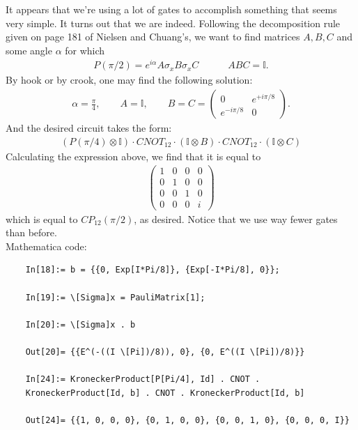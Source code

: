 \documentclass{article}
\theoremstyle{definition}
\newcommand{\al}{\alpha}
\newcommand{\f}[2]{\frac{#1}{#2}}
\begin{document}
\begin{enumerate}[label=(\alph*)]
It appears that we're using a lot of gates to accomplish something that seems very simple. It turns out that we are indeed. Following the decomposition rule given on page 181 of Nielsen and Chuang's, we want to find matrices $A,B,C$ and some angle $\alpha$ for which 
\begin{align*}
P(\pi/2) = e^{i\al} A\sigma_x B\sigma_x C \quad\quad\quad ABC = \mathbb{I}.
\end{align*}
By hook or by crook, one may find the following solution:
\begin{align*}
\al = \f{\pi}{4}, \quad\quad A=\mathbb{I}, \quad \quad B = C = \begin{pmatrix}
0 & e^{+i\pi/8} \\ e^{-i\pi/8} & 0
\end{pmatrix}.
\end{align*}
And the desired circuit takes the form:
\begin{align*}
(P(\pi/4)\otimes \mathbb{I}) \cdot CNOT_{12} \cdot (\mathbb{I} \otimes B) \cdot CNOT_{12} \cdot (\mathbb{I} \otimes C)
\end{align*}
Calculating the expression above, we find that it is equal to
\begin{align*}
\begin{pmatrix}
1 & 0 & 0 & 0 \\
0 & 1 & 0 & 0 \\
0 & 0 & 1 & 0 \\
0 & 0 & 0 & i
\end{pmatrix}
\end{align*}
which is equal to $CP_{12}(\pi/2)$, as desired. Notice that we use way fewer gates than before. \\


Mathematica code:
\begin{lstlisting}
	In[18]:= b = {{0, Exp[I*Pi/8]}, {Exp[-I*Pi/8], 0}};
	
	In[19]:= \[Sigma]x = PauliMatrix[1];
	
	In[20]:= \[Sigma]x . b
	
	Out[20]= {{E^(-((I \[Pi])/8)), 0}, {0, E^((I \[Pi])/8)}}
	
	In[24]:= KroneckerProduct[P[Pi/4], Id] . CNOT . 
	KroneckerProduct[Id, b] . CNOT . KroneckerProduct[Id, b]
	
	Out[24]= {{1, 0, 0, 0}, {0, 1, 0, 0}, {0, 0, 1, 0}, {0, 0, 0, I}}
\end{lstlisting}
\end{enumerate}
\end{document}
